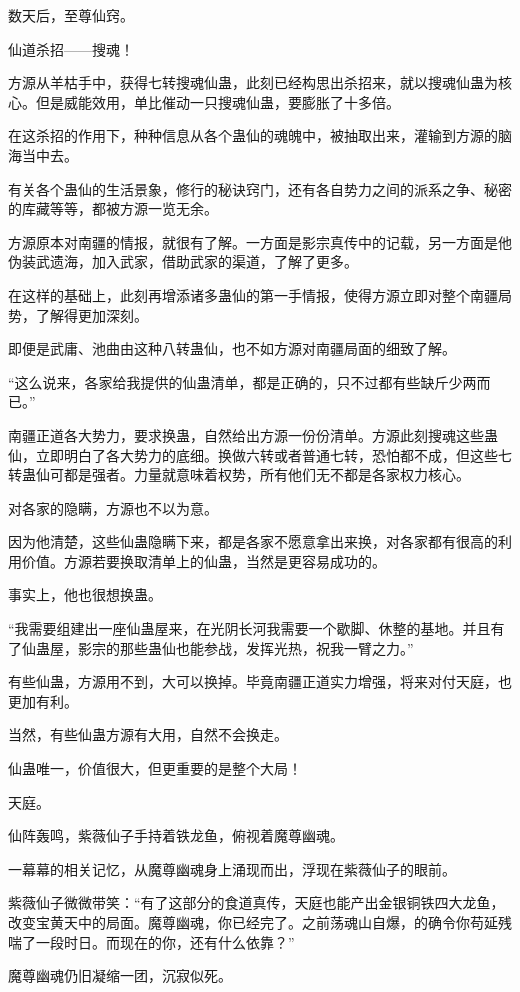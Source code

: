 \begin{this_body}
数天后，至尊仙窍。

仙道杀招——搜魂！

方源从羊枯手中，获得七转搜魂仙蛊，此刻已经构思出杀招来，就以搜魂仙蛊为核心。但是威能效用，单比催动一只搜魂仙蛊，要膨胀了十多倍。

在这杀招的作用下，种种信息从各个蛊仙的魂魄中，被抽取出来，灌输到方源的脑海当中去。

有关各个蛊仙的生活景象，修行的秘诀窍门，还有各自势力之间的派系之争、秘密的库藏等等，都被方源一览无余。

方源原本对南疆的情报，就很有了解。一方面是影宗真传中的记载，另一方面是他伪装武遗海，加入武家，借助武家的渠道，了解了更多。

在这样的基础上，此刻再增添诸多蛊仙的第一手情报，使得方源立即对整个南疆局势，了解得更加深刻。

即便是武庸、池曲由这种八转蛊仙，也不如方源对南疆局面的细致了解。

“这么说来，各家给我提供的仙蛊清单，都是正确的，只不过都有些缺斤少两而已。”

南疆正道各大势力，要求换蛊，自然给出方源一份份清单。方源此刻搜魂这些蛊仙，立即明白了各大势力的底细。换做六转或者普通七转，恐怕都不成，但这些七转蛊仙可都是强者。力量就意味着权势，所有他们无不都是各家权力核心。

对各家的隐瞒，方源也不以为意。

因为他清楚，这些仙蛊隐瞒下来，都是各家不愿意拿出来换，对各家都有很高的利用价值。方源若要换取清单上的仙蛊，当然是更容易成功的。

事实上，他也很想换蛊。

“我需要组建出一座仙蛊屋来，在光阴长河我需要一个歇脚、休整的基地。并且有了仙蛊屋，影宗的那些蛊仙也能参战，发挥光热，祝我一臂之力。”

有些仙蛊，方源用不到，大可以换掉。毕竟南疆正道实力增强，将来对付天庭，也更加有利。

当然，有些仙蛊方源有大用，自然不会换走。

仙蛊唯一，价值很大，但更重要的是整个大局！

天庭。

仙阵轰鸣，紫薇仙子手持着铁龙鱼，俯视着魔尊幽魂。

一幕幕的相关记忆，从魔尊幽魂身上涌现而出，浮现在紫薇仙子的眼前。

紫薇仙子微微带笑：“有了这部分的食道真传，天庭也能产出金银铜铁四大龙鱼，改变宝黄天中的局面。魔尊幽魂，你已经完了。之前荡魂山自爆，的确令你苟延残喘了一段时日。而现在的你，还有什么依靠？”

魔尊幽魂仍旧凝缩一团，沉寂似死。

\end{this_body}

